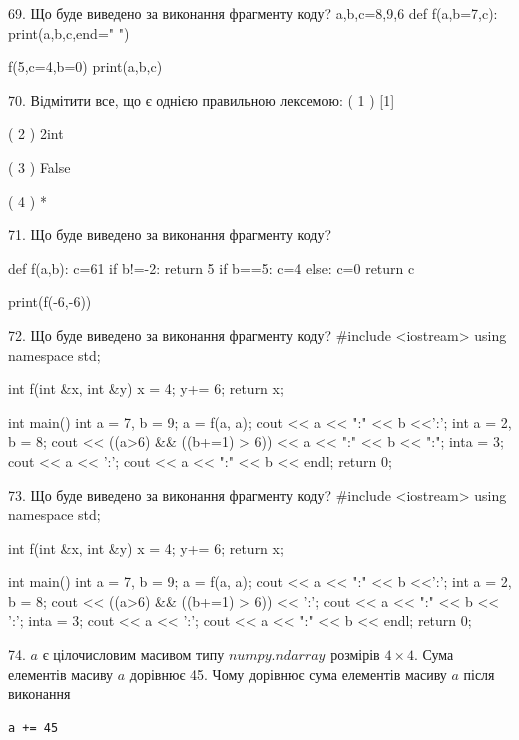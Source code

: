 \documentclass[11pt]{article}
\begin{document}

69. Що буде виведено за виконання фрагменту коду?
a,b,c=8,9,6
def f(a,b=7,c):
    print(a,b,c,end=" ")

f(5,c=4,b=0)
print(a,b,c)


70. %
Відмітити все, що є однією правильною лексемою:
( 1 ) [1]

( 2 ) 2int

( 3 ) False

( 4 ) *


71. Що буде виведено за виконання фрагменту коду?

def f(a,b):
    c=61
    if b!=-2:
        return 5
    if b==5:
         c=4
    else: 
        c=0
    return c

print(f(-6,-6))


72. Що буде виведено за виконання фрагменту коду?
#include <iostream>
using namespace std;

int f(int &x, int &y){
    x = 4;
    y+= 6;
    return x;
}

int main(){
    int a = 7, b = 9;
    a = f(a, a);
    cout << a << ":" << b <<':';
    {
        int a = 2, b = 8;
        cout << ((a>6) && ((b+=1) > 6))
             << a << ":" << b << ":";
    }
    {
        inta = 3;
        cout << a << ':';
    }
    cout << a << ":" << b << endl;
    return 0;
}



73. Що буде виведено за виконання фрагменту коду?
#include <iostream>
using namespace std;

int f(int &x, int &y){
    x = 4;
    y+= 6;
    return x;
}

int main(){
    int a = 7, b = 9;
    a = f(a, a);
    cout << a << ":" << b <<':';
    {
        int a = 2, b = 8;
        cout << ((a>6) && ((b+=1) > 6)) << ':';
        cout << a << ":" << b << ':';
    }
    {
        inta = 3;
        cout << a << ':';
    }
    cout << a << ":" << b << endl;
    return 0;
}



74. 
$a$ є цілочисловим масивом типу $numpy.ndarray$ розмірів $4{\times}4$. Сума елементів масиву $a$ дорівнює 45. Чому дорівнює сума елементів масиву $a$ після виконання 
\begin{verbatim}
a += 45
\end{verbatim}
\end{document}
